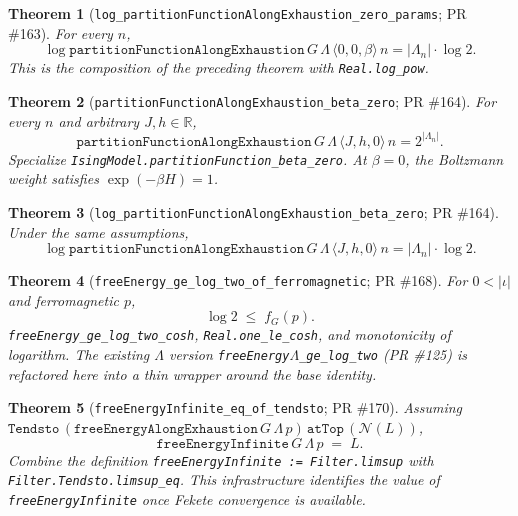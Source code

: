 \documentclass[a4paper,11pt]{article}
\newtheorem{theorem}{Theorem}
\newcommand{\LeanLambda}{\texorpdfstring{\ensuremath{\Lambda}}{Lambda}}
\begin{document}
\begin{theorem}[\texttt{log\_partitionFunctionAlongExhaustion\_zero\_params}; PR \#163]
For every $n$,
\[
  \log \texttt{partitionFunctionAlongExhaustion}\,G\,\Lambda\,\langle 0, 0, \beta \rangle\,n
    = |\Lambda_n| \cdot \log 2.
\]
This is the composition of the preceding theorem with \texttt{Real.log\_pow}.
\end{theorem}

\begin{theorem}[\texttt{partitionFunctionAlongExhaustion\_beta\_zero}; PR \#164]
For every $n$ and arbitrary $J, h \in \mathbb R$,
\[
  \texttt{partitionFunctionAlongExhaustion}\,G\,\Lambda\,\langle J, h, 0 \rangle\,n
    = 2^{|\Lambda_n|}.
\]
Specialize \texttt{IsingModel.partitionFunction\_beta\_zero}. At
$\beta = 0$, the Boltzmann weight satisfies $\exp(-\beta H) = 1$.
\end{theorem}

\begin{theorem}[\texttt{log\_partitionFunctionAlongExhaustion\_beta\_zero}; PR \#164]
Under the same assumptions,
\[
  \log \texttt{partitionFunctionAlongExhaustion}\,G\,\Lambda\,\langle J, h, 0 \rangle\,n
    = |\Lambda_n| \cdot \log 2.
\]
\end{theorem}

\begin{theorem}[\texttt{freeEnergy\_ge\_log\_two\_of\_ferromagnetic}; PR \#168]
For $0 < |\iota|$ and ferromagnetic $p$,
\[
  \log 2 \;\le\; f_G(p).
\]
\texttt{freeEnergy\_ge\_log\_two\_cosh}, \texttt{Real.one\_le\_cosh}, and
monotonicity of logarithm. The existing $\Lambda$ version
\texttt{freeEnergy\LeanLambda\_ge\_log\_two} (PR \#125) is refactored here into a
thin wrapper around the base identity.
\end{theorem}

\begin{theorem}[\texttt{freeEnergyInfinite\_eq\_of\_tendsto}; PR \#170]
Assuming
$\texttt{Tendsto}\,(\texttt{freeEnergyAlongExhaustion}\,G\,\Lambda\,p)\,
\texttt{atTop}\,(\mathcal N (L))$,
\[
  \texttt{freeEnergyInfinite}\,G\,\Lambda\,p \;=\; L.
\]
Combine the definition \texttt{freeEnergyInfinite := Filter.limsup} with
\texttt{Filter.Tendsto.limsup\_eq}. This infrastructure identifies the value
of \texttt{freeEnergyInfinite} once Fekete convergence is available.
\end{theorem}
\end{document}
